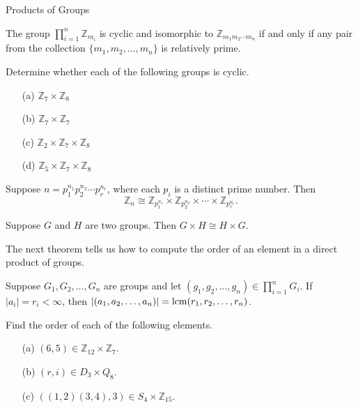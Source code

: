 \begin{section}{Products of Groups}
\begin{theorem}
The group $\prod_{i=1}^n \mathbb{Z}_{m_i}$ is cyclic and isomorphic to $\mathbb{Z}_{m_1m_2\cdots m_n}$ if and only if any pair from the collection $\{m_1,m_2,\ldots, m_n\}$ is relatively prime.
\end{theorem}

\begin{exercise}
Determine whether each of the following groups is cyclic.
\begin{enumerate}
\item[(a)] $\mathbb{Z}_7\times \mathbb{Z}_8$
\item[(b)] $\mathbb{Z}_7\times \mathbb{Z}_7$
\item[(c)] $\mathbb{Z}_2\times \mathbb{Z}_7\times \mathbb{Z}_8$
\item[(d)] $\mathbb{Z}_5\times \mathbb{Z}_7\times \mathbb{Z}_8$
\end{enumerate}
\end{exercise}

\begin{theorem}
Suppose $n=p_1^{n_1}p_2^{n_2}\cdots p_r^{n_r}$, where each $p_i$ is a distinct prime number.  Then
\[
\mathbb{Z}_n\cong \mathbb{Z}_{p_1^{n_1}}\times \mathbb{Z}_{p_2^{n_2}}\times \cdots \times \mathbb{Z}_{p_r^{n_r}}.
\]
\end{theorem}

\begin{theorem}
Suppose $G$ and $H$ are two groups.  Then $G\times H\cong H\times G$.
\end{theorem}

The next theorem tells us how to compute the order of an element in a direct product of groups.

\begin{theorem}
Suppose $G_1, G_2,\ldots, G_n$ are groups and let $(g_1,g_2,\ldots, g_n)\in \prod_{i=1}^nG_i$.  If $|a_i|=r_i<\infty$, then $|(a_1,a_2,\ldots, a_n)|=\operatorname{lcm}(r_1,r_2,\ldots,r_n)$.
\end{theorem}

\begin{exercise}
Find the order of each of the following elements.
\begin{enumerate}
\item[(a)] $(6,5)\in\mathbb{Z}_{12}\times \mathbb{Z}_7$.
\item[(b)] $(r,i)\in D_3\times Q_8$.
\item[(c)] $((1,2)(3,4),3)\in S_4\times \mathbb{Z}_{15}$.
\end{enumerate}
\end{exercise}


\end{section}
